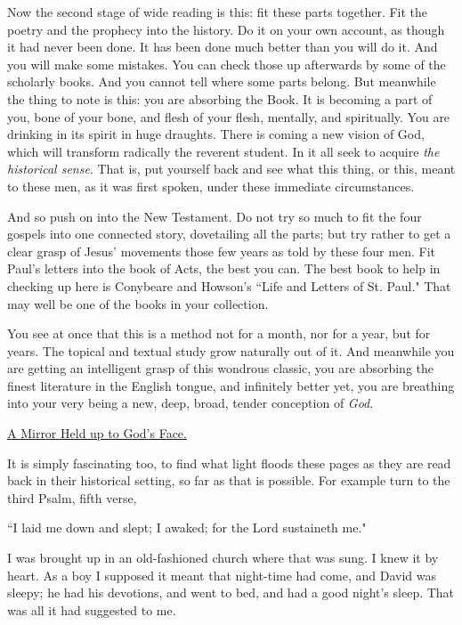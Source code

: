 Now the second stage of wide reading is this: fit these parts together.
Fit the poetry and the prophecy into the history. Do it on your own
account, as though it had never been done. It has been done much better
than you will do it. And you will make some mistakes. You can check those
up afterwards by some of the scholarly books. And you cannot tell where
some parts belong. But meanwhile the thing to note is this: you are
absorbing the Book. It is becoming a part of you, bone of your bone, and
flesh of your flesh, mentally, and spiritually. You are drinking in its
spirit in huge draughts. There is coming a new vision of God, which will
transform radically the reverent student. In it all seek to acquire \textit{the
historical sense}. That is, put yourself back and see what this thing, or
this, meant to these men, as it was first spoken, under these immediate
circumstances.

And so push on into the New Testament. Do not try so much to fit the four
gospels into one connected story, dovetailing all the parts; but try
rather to get a clear grasp of Jesus' movements those few years as told by
these four men. Fit Paul's letters into the book of Acts, the best you
can. The best book to help in checking up here is Conybeare and Howson's
``Life and Letters of St. Paul." That may well be one of the books in your
collection.

You see at once that this is a method not for a month, nor for a year, but
for years. The topical and textual study grow naturally out of it. And
meanwhile you are getting an intelligent grasp of this wondrous classic,
you are absorbing the finest literature in the English tongue, and
infinitely better yet, you are breathing into your very being a new, deep,
broad, tender conception of \textit{God}.



\underline{A Mirror Held up to God's Face.}


It is simply fascinating too, to find what light floods these pages as
they are read back in their historical setting, so far as that is
possible. For example turn to the third Psalm, fifth verse,

    ``I laid me down and slept;
    I awaked; for the Lord sustaineth me."

I was brought up in an old-fashioned church where that was sung. I knew it
by heart. As a boy I supposed it meant that night-time had come, and David
was sleepy; he had his devotions, and went to bed, and had a good night's
sleep. That was all it had suggested to me.

